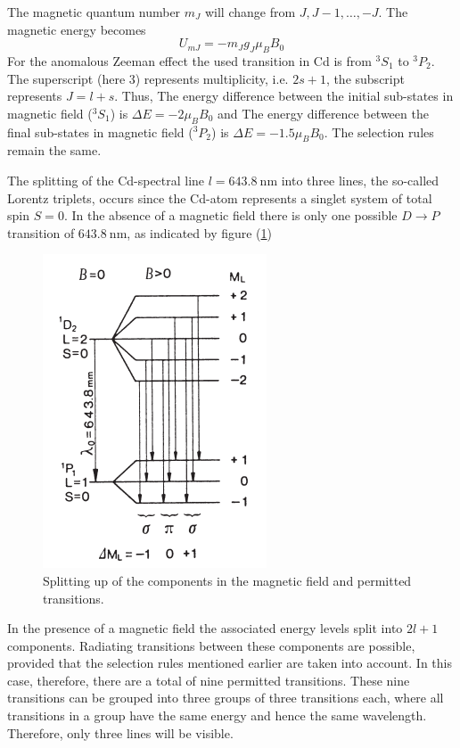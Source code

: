 \documentclass[%
 reprint,
nofootinbib,
 amsmath,amssymb,
 aps,
floatfix,
]{revtex4-2}
\begin{document}
    The magnetic quantum number $m_J$ will change from $J, J-1, \ldots, -J$. The magnetic energy becomes
    \begin{equation}
        U_{mJ} = -m_J g_J \mu_B B_0
    \end{equation}
    For the anomalous Zeeman effect the used transition in Cd is from $^3S_1$ to $^3P_2$. The superscript (here 3) represents multiplicity, i.e. $2s+1$, the subscript represents $J = l+s$. Thus, The energy difference between the initial sub-states in magnetic field ($^3S_1$) is $\Delta E = -2 \mu_B B_0$ and The energy difference between the final sub-states in magnetic field ($^3P_2$) is $\Delta E = -1.5 \mu_B B_0$. The selection rules remain the same.
    \par
    The splitting of the Cd-spectral line $l = \SI{643.8}{\nano \metre}$ into three lines, the so-called Lorentz triplets, occurs since the Cd-atom represents a singlet system of total spin $S= 0$. In the absence of a magnetic field there is only one possible $D \rightarrow P$ transition of $\SI{643.8}{\nano \metre}$, as indicated by figure (\ref{fig:splitting})
    \begin{figure}
        \centering
        \includegraphics{Figures/splitting.png}
        \caption{Splitting up of the components in the magnetic field and permitted transitions.}
        \label{fig:splitting}
    \end{figure}
    In the presence of a magnetic field the associated energy levels split into $2l+1$ components. Radiating transitions between these components are possible, provided that the selection rules mentioned earlier are taken into account. In this case, therefore, there are a total of nine permitted transitions. These nine transitions can be grouped into three groups of three transitions each, where all transitions in a group have the same energy and hence the same wavelength. Therefore, only three lines will be visible.
\end{document}
